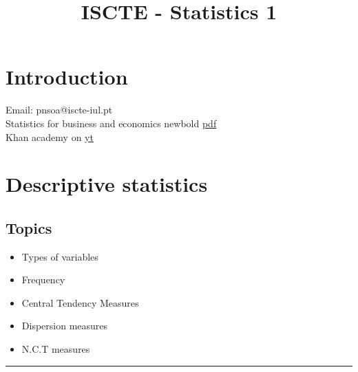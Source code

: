 \documentclass[a4paper,10pt,onecolumn]{article}
\title{ISCTE - Statistics 1}
\begin{document}
\maketitle

\section{Introduction}
Email: pnsoa@iscte-iul.pt
\\Statistics for business and economics newbold \href{https://handoutset.com/wp-content/uploads/2022/07/Statistics-for-business-and-economics-Paul-Newbold-William-Lee-Carlson-etc..pdf}{pdf}
\\ Khan academy on \href{https://www.youtube.com/@khanacademy}{yt}
\section{Descriptive statistics}
\subsection{Topics}
\begin{itemize}
  \item Types of variables
  \item Frequency
  \item Central Tendency Measures
  \item Dispersion measures
  \item N.C.T measures
\end{itemize}
\hrule %
\end{document}

